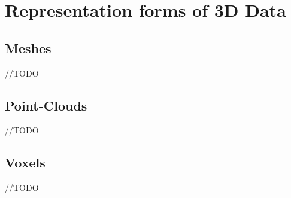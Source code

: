 \section{Representation forms of 3D Data}
\label{3Drepresentation}

\subsection{Meshes}
//TODO

\subsection{Point-Clouds}
//TODO

\subsection{Voxels}
//TODO

